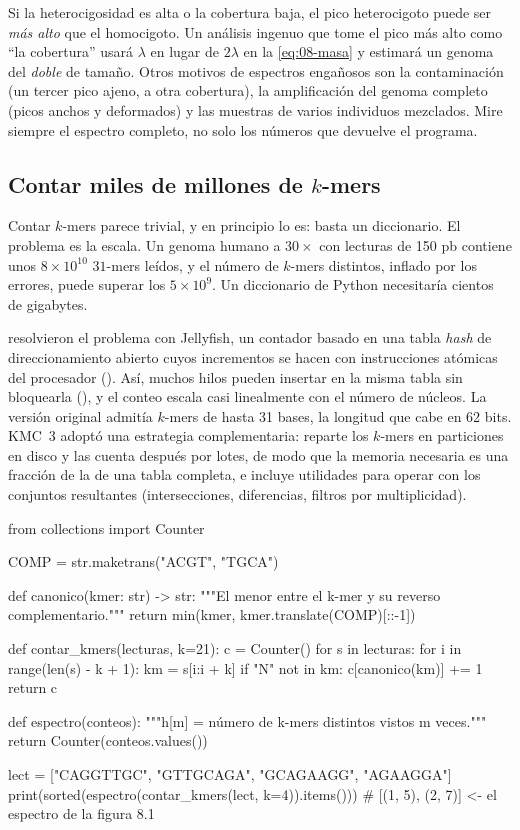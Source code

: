 \begin{cuidado}
Si la heterocigosidad es alta o la cobertura baja, el pico heterocigoto puede ser \emph{más alto} que el homocigoto. Un análisis ingenuo que tome el pico más alto como ``la cobertura'' usará $\lambda$ en lugar de $2\lambda$ en la \cref{eq:08-masa} y estimará un genoma del \emph{doble} de tamaño. Otros motivos de espectros engañosos son la contaminación (un tercer pico ajeno, a otra cobertura), la amplificación del genoma completo (picos anchos y deformados) y las muestras de varios individuos mezclados. Mire siempre el espectro completo, no solo los números que devuelve el programa.
\end{cuidado}

\subsection{Contar miles de millones de \texorpdfstring{$k$}{k}-mers}

Contar $k$-mers parece trivial, y en principio lo es: basta un diccionario. El problema es la escala. Un genoma humano a $30\times$ con lecturas de 150 pb contiene unos $8\times10^{10}$ $31$-mers leídos, y el número de $k$-mers distintos, inflado por los errores, puede superar los $5\times10^9$. Un diccionario de Python necesitaría cientos de gigabytes.

\textcite{c08-marcais2011} resolvieron el problema con Jellyfish, un contador basado en una tabla \emph{hash} de direccionamiento abierto cuyos incrementos se hacen con instrucciones atómicas del procesador (). Así, muchos hilos pueden insertar en la misma tabla sin bloquearla (), y el conteo escala casi linealmente con el número de núcleos. La versión original admitía $k$-mers de hasta 31 bases, la longitud que cabe en 62 bits. KMC~3 \parencite{c08-kokot2017} adoptó una estrategia complementaria: reparte los $k$-mers en particiones en disco y las cuenta después por lotes, de modo que la memoria necesaria es una fracción de la de una tabla completa, e incluye utilidades para operar con los conjuntos resultantes (intersecciones, diferencias, filtros por multiplicidad).

\begin{codigo}[espectro.py]
from collections import Counter

COMP = str.maketrans("ACGT", "TGCA")

def canonico(kmer: str) -> str:
    """El menor entre el k-mer y su reverso complementario."""
    return min(kmer, kmer.translate(COMP)[::-1])

def contar_kmers(lecturas, k=21):
    c = Counter()
    for s in lecturas:
        for i in range(len(s) - k + 1):
            km = s[i:i + k]
            if "N" not in km:
                c[canonico(km)] += 1
    return c

def espectro(conteos):
    """h[m] = número de k-mers distintos vistos m veces."""
    return Counter(conteos.values())

lect = ["CAGGTTGC", "GTTGCAGA", "GCAGAAGG", "AGAAGGA"]
print(sorted(espectro(contar_kmers(lect, k=4)).items()))
# [(1, 5), (2, 7)]   <- el espectro de la figura 8.1
\end{codigo}

